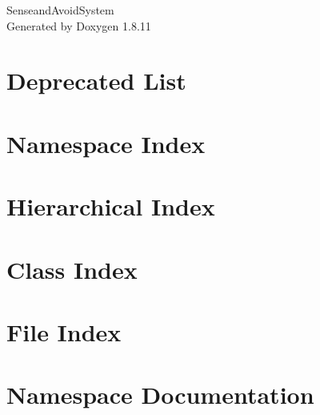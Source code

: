 \documentclass[twoside]{book}
\newcommand{\+}{\discretionary{\mbox{\scriptsize$\hookleftarrow$}}{}{}}
\newcommand{\clearemptydoublepage}{%
  \newpage{\pagestyle{empty}\cleardoublepage}%
}
\begin{document}
\hypersetup{pageanchor=false,
             bookmarksnumbered=true,
             pdfencoding=unicode
            }
\begin{titlepage}
\vspace*{7cm}
\begin{center}%
{\Large Senseand\+Avoid\+System }\\
\vspace*{1cm}
{\large Generated by Doxygen 1.8.11}\\
\end{center}
\end{titlepage}
\clearemptydoublepage
\tableofcontents
\clearemptydoublepage
{}
\hypersetup{pageanchor=true}

\chapter{Deprecated List}
\label{deprecated}
\hypertarget{deprecated}{}

\chapter{Namespace Index}

\chapter{Hierarchical Index}

\chapter{Class Index}

\chapter{File Index}

\chapter{Namespace Documentation}







\end{document}
